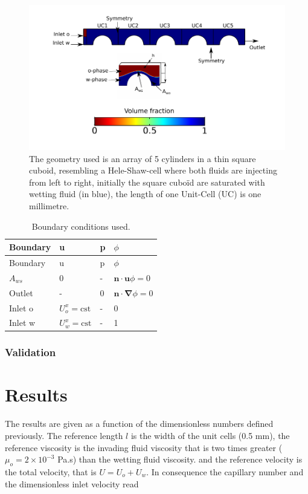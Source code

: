 \documentclass[]{article}
\begin{document}
\begin{figure}
\hypertarget{fig:model}{%
\centering
\includegraphics{figures/pdf/model.pdf}
\caption{The geometry used is an array of 5 cylinders in a thin square
cuboid, resembling a Hele-Shaw-cell where both fluids are injecting from
left to right, initially the square cuboïd are saturated with wetting
fluid (in blue), the length of one Unit-Cell (UC) is one
millimetre.}\label{fig:model}
}
\end{figure}

\begin{longtable}[]{@{}llll@{}}
\caption{Boundary conditions used. \label{tbl:BC}}\tabularnewline
\toprule
Boundary & u & p & \(\phi\)\tabularnewline
\midrule
\endfirsthead
\toprule
Boundary & u & p & \(\phi\)\tabularnewline
\midrule
\endhead
\(A_{ws}\) & 0 & - & \(\mathbf{n}\cdot\mathbf{u}\phi=0\)\tabularnewline
Outlet & - & 0 &
\(\mathbf{n}\cdot\boldsymbol{\nabla}\phi=0\)\tabularnewline
Inlet o & \(U_{o}^{x}=\mathrm{cst}\) & - & 0\tabularnewline
Inlet w & \(U_{w}^{x}=\mathrm{cst}\) & - & 1\tabularnewline
\bottomrule
\end{longtable}

\hypertarget{validation}{%
\subsubsection{Validation}\label{validation}}

\hypertarget{results}{%
\section{Results}\label{results}}

The results are given as a function of the dimensionless numbers defined
previously. The reference length \(l\) is the width of the unit cells
(0.5 mm), the reference viscosity is the invading fluid viscosity that
is two times greater (\(\mu_o=2\times 10^{-3}\) Pa.s) than the wetting
fluid viscosity. and the reference velocity is the total velocity, that
is \(U=U_{o}+U_{w}\). In consequence the capillary number and the
dimensionless inlet velocity read
\end{document}
